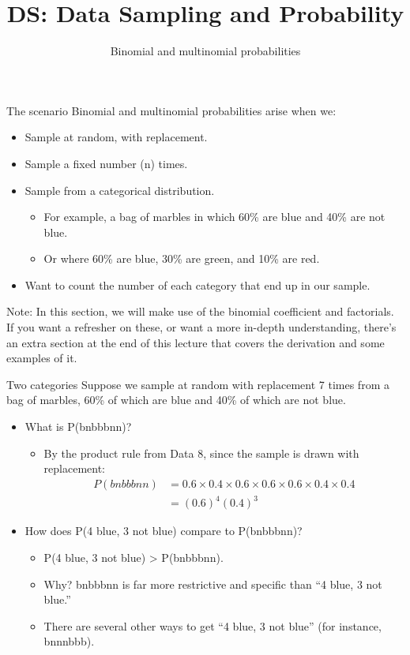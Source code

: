 \documentclass[aspectratio=169]{../latex_main/tntbeamer}  %
\title[Introduction]{DS: Data Sampling and Probability}
\subtitle{Binomial and multinomial probabilities}
\begin{document}
	
	\maketitle
	
	
	\begin{frame}{The scenario}
	Binomial and multinomial probabilities arise when we:
	\begin{itemize}
	    \item Sample at random, with replacement.
	    \item Sample a fixed number (n) times.
	    \item Sample from a categorical distribution.
	    \begin{itemize}
	        \item For example, a bag of marbles in which 60\% are blue and 40\% are not blue.
	        \item Or where 60\% are blue, 30\% are green, and 10\% are red.
	    \end{itemize}
	    \item Want to count the number of each category that end up in our sample.
	\end{itemize}
	    Note: In this section, we will make use of the binomial coefficient and factorials. If you want a refresher on these, or want a more in-depth understanding, there’s an extra section at the end of this lecture that covers the derivation and some examples of it.

	\end{frame}
	
	
	\begin{frame}{Two categories}
	Suppose we sample at random with replacement 7 times from a bag of marbles, 60\% of which are blue and 40\% of which are not blue.

	\begin{itemize}
	    \item What is P(bnbbbnn)?
	    \begin{itemize}
	        \item By the product rule from Data 8, since the sample is drawn with replacement:
            \begin{align*}
                P(bnbbbnn) &= 0.6 \times 0.4 \times 0.6 \times 0.6 \times 0.6 \times 0.4 \times 0.4 \\
                &= (0.6)^4 (0.4)^3
            \end{align*}
	    \end{itemize}
	    \item How does P(4 blue, 3 not blue) compare to P(bnbbbnn)?
	    \begin{itemize}
	        \item P(4 blue, 3 not blue) > P(bnbbbnn).
	        \item Why? bnbbbnn is far more restrictive and specific than “4 blue, 3 not blue.”
	        \item There are several other ways to get “4 blue, 3 not blue” (for instance, bnnnbbb).
	    \end{itemize}
	\end{itemize}

	\end{frame}
	
\end{document}
